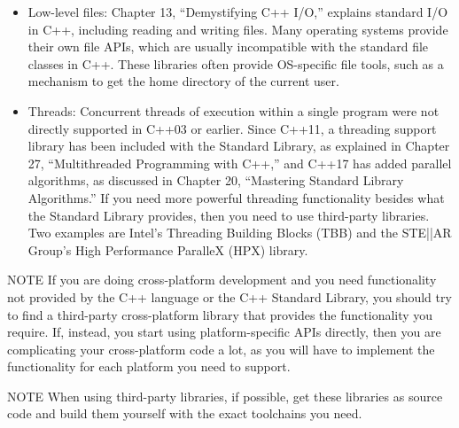 \begin{itemize}
\item
Low-level files: Chapter 13, “Demystifying C++ I/O,” explains standard I/O in C++, including reading and writing files. Many operating systems provide their own file APIs, which are usually incompatible with the standard file classes in C++. These libraries often provide OS-specific file tools, such as a mechanism to get the home directory of the current user.

\item
Threads: Concurrent threads of execution within a single program were not directly supported in C++03 or earlier. Since C++11, a threading support library has been included with the Standard Library, as explained in Chapter 27, “Multithreaded Programming with C++,” and C++17 has added parallel algorithms, as discussed in Chapter 20, “Mastering Standard Library Algorithms.” If you need more powerful threading functionality besides what the Standard Library provides, then you need to use third-party libraries. Two examples are Intel’s Threading Building Blocks (TBB) and the STE||AR Group’s High Performance ParalleX (HPX) library.
\end{itemize}

\begin{myNotic}{NOTE}
If you are doing cross-platform development and you need functionality not provided by the C++ language or the C++ Standard Library, you should try to find a third-party cross-platform library that provides the functionality you require. If, instead, you start using platform-specific APIs directly, then you are complicating your cross-platform code a lot, as you will have to implement the functionality for each platform you need to support.
\end{myNotic}

\begin{myNotic}{NOTE}
When using third-party libraries, if possible, get these libraries as source code and build them yourself with the exact toolchains you need.
\end{myNotic}

















